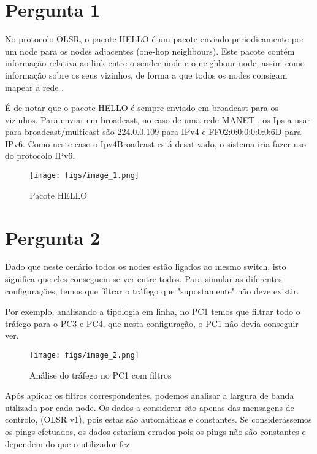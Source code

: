 \section{Pergunta 1} \label{ex1}

No protocolo OLSR, o pacote HELLO é um pacote enviado periodicamente por um node para os nodes adjacentes (one-hop neighbours).
Este pacote contém informação relativa ao link entre o sender-node e o neighbour-node, assim como informação sobre os seus vizinhos,
de forma a que todos os nodes consigam mapear a rede \cite{hello_packet}.

É de notar que o pacote HELLO é sempre enviado em broadcast para os vizinhos.
Para enviar em broadcast, no caso de uma rede MANET \cite{mannet}, os Ips a usar para broadcast/multicast são 224.0.0.109 para IPv4
e FF02:0:0:0:0:0:0:6D para IPv6. Como neste caso o Ipv4Broadcast está desativado, o sistema iria fazer uso do protocolo IPv6.

\begin{figure}[H]
    \centering
    \texttt{[image: figs/image\_1.png]}
    \caption{Pacote HELLO}
    \label{fig:1}
\end{figure}

\section{Pergunta 2} \label{ex2}

Dado que neste cenário todos os nodes estão ligados ao mesmo switch, isto significa que eles conseguem se ver entre todos.
Para simular as diferentes configurações, temos que filtrar o tráfego que "supostamente" não deve existir.

Por exemplo, analisando a tipologia em linha, no PC1 temos que filtrar todo o tráfego para o PC3 e PC4, que nesta configuração,
o PC1 não devia conseguir ver.

\begin{figure}[H]
    \centering
    \texttt{[image: figs/image\_2.png]}
    \caption{Análise do tráfego no PC1 com filtros}
    \label{fig:2}
\end{figure}

Após aplicar os filtros correspondentes, podemos analisar a largura de banda utilizada por cada node.
Os dados a considerar são apenas das mensagens de controlo, (OLSR v1), pois estas são automáticas e constantes.
Se considerássemos os pings efetuados, os dados estariam errados pois os pings não são constantes e dependem do que o utilizador fez. 

